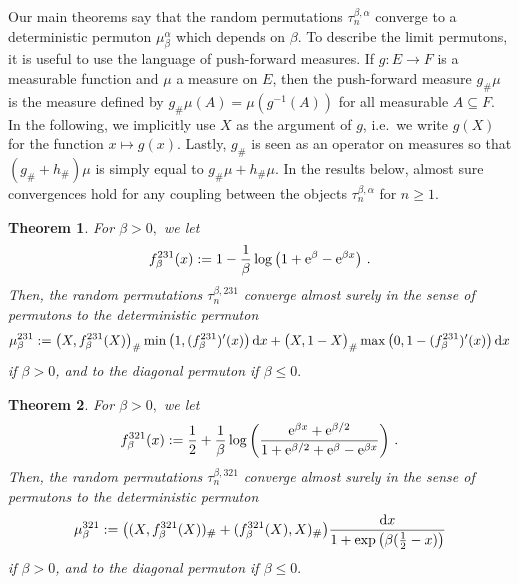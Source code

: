 \documentclass[a4paper,11pt]{amsart}
\newcommand{\dd}{\textup{d}}
\newcommand{\ee}{\textup{e}}
\newtheorem{thm}{Theorem}
\theoremstyle{definition}
\begin{document}
Our main theorems say that
the random permutations $\tau^{\beta,\alpha}_{n}$ converge to a deterministic permuton $\mu^\alpha_\beta$ which depends on $\beta$.
To describe the limit permutons, it is useful to use the language of push-forward measures. 
If $g:E \to F$ is a measurable function and 
$\mu$ a measure on $E$, then the push-forward measure $g_\# \mu$ 
is the measure defined by $g_\# \mu(A)=\mu(g^{-1}(A))$ for all measurable $A \subseteq F$. 
In the following, we implicitly use $X$ as the argument of $g$,
i.e.~we write $g(X)$ for the function $x \mapsto g(x)$. 
Lastly, $g_\#$ is seen as an operator on measures so that $(g_\#+h_\#)\mu$ is simply equal to $g_\# \mu+h_\# \mu$. In the results below, almost sure convergences hold for any coupling between the objects $\tau^{\beta,\alpha}_n$ for $n \geq 1$.

\begin{thm}
\label{thm:phase_transition_231}
For $\beta >0,$ we let
\[
    f^{231}_\beta(x) := 1 - \frac{1}{\beta} \log\left( 1 + \ee^\beta - \ee^{\beta x} \right) \,.
\]
Then, the random permutations $\tau^{\beta,231}_{n}$ converge almost surely in the sense of permutons to the deterministic permuton
\[
    \mu^{231}_\beta :=  \big(X,f^{231}_\beta(X)\big)_\# \min\left(1,(f^{231}_\beta)'(x) \right) \dd x
    + \big( X,1-X \big)_\# \max\left(0, 1- (f^{231}_\beta)'(x) \right) \dd x %
\]
if $\beta>0$,
and to the diagonal permuton if $\beta\le 0.$
\end{thm}

\begin{thm}
\label{thm:phase_transition_321}
For $\beta >0,$ we let
\[ f^{321}_\beta(x) := \frac12 + \frac1\beta \log\left( \frac{\ee^{\beta x} + \ee^{\beta/2}}{1 + \ee^{\beta/2} + \ee^{\beta} - \ee^{\beta x}} \right) \,.\]
Then, the random permutations $\tau^{\beta,321}_{n}$ converge almost surely in the sense of permutons to the deterministic permuton
\[ \mu^{321}_\beta := \big( (X,f^{321}_\beta(X))_\# + (f^{321}_\beta(X),X)_\#  \big) \frac{\dd x}{1+\exp\left(\beta(\frac12-x) \right)} %
\]
if $\beta>0$,
and to the diagonal permuton if $\beta\le 0.$
\end{thm}
\end{document}
